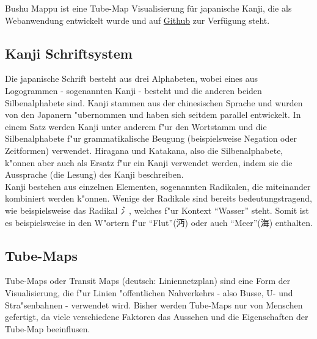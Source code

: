 Bushu Mappu ist eine Tube-Map Visualisierung für japanische Kanji, die als Webanwendung entwickelt wurde und auf \href{http://rajikarubijua.github.io/bushumappu/}{Github} zur Verfügung steht.
\subsection{Kanji Schriftsystem}
Die japanische Schrift besteht aus drei Alphabeten, wobei eines aus Logogrammen - sogenannten Kanji - besteht und die anderen beiden Silbenalphabete sind. Kanji stammen aus der chinesischen Sprache und wurden von den Japanern "ubernommen und haben sich seitdem parallel entwickelt. In einem Satz werden Kanji unter anderem f"ur den Wortstamm und die Silbenalphabete f"ur grammatikalische Beugung (beispielsweise Negation oder Zeitformen) verwendet. Hiragana und Katakana, also die Silbenalphabete, k"onnen aber auch als Ersatz f"ur ein Kanji verwendet werden, indem sie die Aussprache (die Lesung) des Kanji beschreiben. \\
Kanji bestehen aus einzelnen Elementen, sogenannten Radikalen, die miteinander kombiniert werden k"onnen. Wenige der Radikale sind bereits bedeutungstragend, wie beispielsweise das Radikal \emph{氵}, welches f"ur Kontext "`Wasser"' steht. Somit ist es beispielsweise in den W"ortern f"ur "`Flut"'(沔) oder auch "`Meer"'(海) enthalten. 

\subsection{Tube-Maps}
Tube-Maps oder Transit Maps (deutsch: Liniennetzplan) sind eine Form der Visualisierung, die f"ur Linien "offentlichen Nahverkehrs - also Busse, U- und Stra"senbahnen - verwendet wird. Bisher werden Tube-Maps nur von Menschen gefertigt, da viele verschiedene Faktoren das Aussehen und die Eigenschaften der Tube-Map beeinflusen.  
